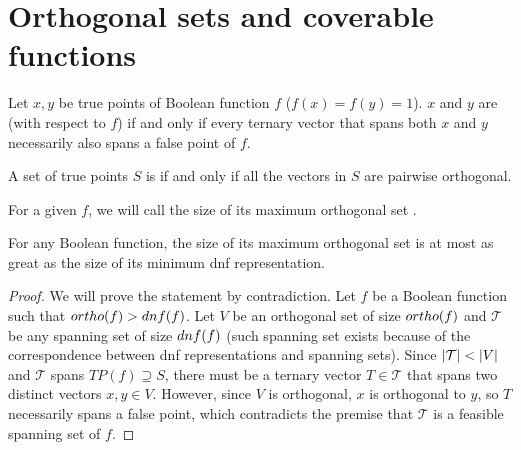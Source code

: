 \section{Orthogonal sets and coverable functions}


\begin{definition}
Let $x, y$ be true points of Boolean function $f$
($f(x) = f(y) = 1$).
$x$ and $y$ are 
(with respect to $f$)
if and only if
every ternary vector that spans both $x$ and $y$
necessarily also spans a false point of $f$.

A set of true points $S$ is 
if and only if
all the vectors in $S$ are pairwise orthogonal.
\end{definition}


For a given $f$,
we will call the size of its maximum orthogonal set
.


\begin{theorem}
\label{theorem:orthodnf}
For any Boolean function,
the size of its maximum orthogonal set
is at most as great
as the size of its minimum \acrshort{dnf} representation.
\end{theorem}

\begin{proof}
We will prove the statement by contradiction.
Let $f$ be a Boolean function such that
$ortho (f) > dnf (f)$.
Let $V$ be an orthogonal set of size $ortho (f)$
and $\mathcal{T}$ be any spanning set
of size $dnf (f)$
(such spanning set exists because of the correspondence
between \acrshort{dnf} representations and spanning sets).
Since $\lvert\mathcal{T}\rvert < \lvert V\rvert$
and $\mathcal{T}$ spans $TP(f) \supseteq S$,
there must be a ternary vector $T \in \mathcal{T}$
that spans
two distinct vectors $x, y \in V$.
However,
since $V$ is orthogonal,
$x$ is orthogonal to $y$,
so $T$ necessarily spans a false point,
which contradicts the premise that $\mathcal{T}$
is a feasible spanning set of $f$.
\end{proof}


